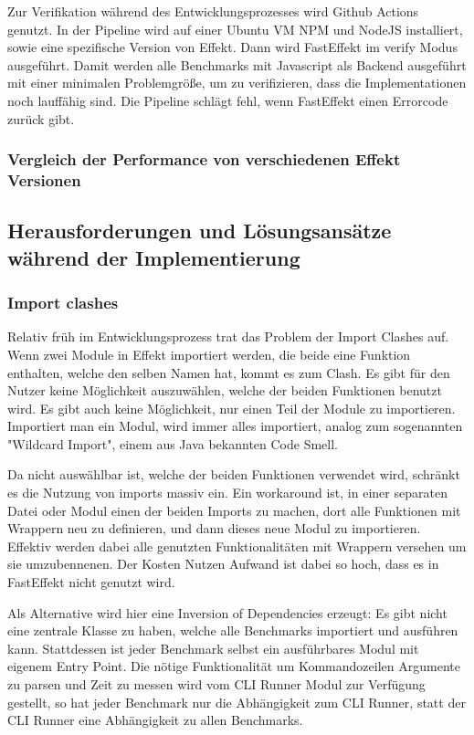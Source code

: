Zur Verifikation während des Entwicklungsprozesses wird Github Actions genutzt. In der Pipeline wird auf einer Ubuntu VM 
NPM und NodeJS installiert, sowie eine spezifische Version von Effekt. Dann wird FastEffekt im verify Modus ausgeführt. 
Damit werden alle Benchmarks mit Javascript als Backend ausgeführt mit einer minimalen Problemgröße, um zu verifizieren, dass die Implementationen noch lauffähig sind.
Die Pipeline schlägt fehl, wenn FastEffekt einen Errorcode zurück gibt.

\subsubsection{ Vergleich der Performance von verschiedenen Effekt Versionen }
 

\subsection{ Herausforderungen und Lösungsansätze während der Implementierung }

\subsubsection{ Import clashes }
Relativ früh im Entwicklungsprozess trat das Problem der Import Clashes auf. Wenn zwei Module in Effekt importiert werden,
die beide eine Funktion enthalten, welche den selben Namen hat, kommt es zum Clash. Es gibt für den Nutzer keine Möglichkeit 
auszuwählen, welche der beiden Funktionen benutzt wird. Es gibt auch keine Möglichkeit, nur einen Teil der Module zu importieren.
Importiert man ein Modul, wird immer alles importiert, analog zum sogenannten "Wildcard Import", einem aus Java bekannten Code Smell.

Da nicht auswählbar ist, welche der beiden Funktionen verwendet wird, schränkt es die Nutzung von imports massiv ein. Ein workaround ist, in einer
separaten Datei oder Modul einen der beiden Imports zu machen, dort alle Funktionen mit Wrappern neu zu definieren, und dann dieses neue Modul zu importieren.
Effektiv werden dabei alle genutzten Funktionalitäten mit Wrappern versehen um sie umzubennenen. Der Kosten Nutzen Aufwand ist dabei so hoch, dass es in FastEffekt nicht genutzt wird.

Als Alternative wird hier eine Inversion of Dependencies erzeugt: Es gibt nicht eine zentrale Klasse zu haben, welche alle Benchmarks importiert und ausführen kann.
Stattdessen ist jeder Benchmark selbst ein ausführbares Modul mit eigenem Entry Point. Die nötige Funktionalität um Kommandozeilen Argumente zu parsen und Zeit zu messen wird vom
CLI Runner Modul zur Verfügung gestellt, so hat jeder Benchmark nur die Abhängigkeit zum CLI Runner, statt der CLI Runner eine Abhängigkeit zu allen Benchmarks.

